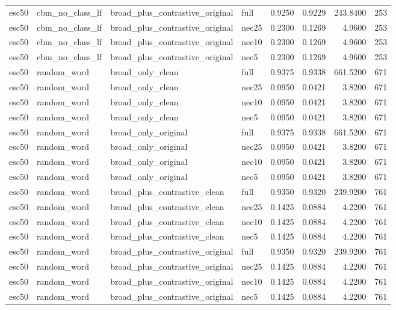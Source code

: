 \begin{table}[t]
\begin{tabular}{llllrrrr}
esc50 & cbm\_no\_class\_lf & broad\_plus\_contrastive\_original & full & 0.9250 & 0.9229 & 243.8400 & 253 \\
esc50 & cbm\_no\_class\_lf & broad\_plus\_contrastive\_original & nec25 & 0.2300 & 0.1269 & 4.9600 & 253 \\
esc50 & cbm\_no\_class\_lf & broad\_plus\_contrastive\_original & nec10 & 0.2300 & 0.1269 & 4.9600 & 253 \\
esc50 & cbm\_no\_class\_lf & broad\_plus\_contrastive\_original & nec5 & 0.2300 & 0.1269 & 4.9600 & 253 \\
esc50 & random\_word & broad\_only\_clean & full & 0.9375 & 0.9338 & 661.5200 & 671 \\
esc50 & random\_word & broad\_only\_clean & nec25 & 0.0950 & 0.0421 & 3.8200 & 671 \\
esc50 & random\_word & broad\_only\_clean & nec10 & 0.0950 & 0.0421 & 3.8200 & 671 \\
esc50 & random\_word & broad\_only\_clean & nec5 & 0.0950 & 0.0421 & 3.8200 & 671 \\
esc50 & random\_word & broad\_only\_original & full & 0.9375 & 0.9338 & 661.5200 & 671 \\
esc50 & random\_word & broad\_only\_original & nec25 & 0.0950 & 0.0421 & 3.8200 & 671 \\
esc50 & random\_word & broad\_only\_original & nec10 & 0.0950 & 0.0421 & 3.8200 & 671 \\
esc50 & random\_word & broad\_only\_original & nec5 & 0.0950 & 0.0421 & 3.8200 & 671 \\
esc50 & random\_word & broad\_plus\_contrastive\_clean & full & 0.9350 & 0.9320 & 239.9200 & 761 \\
esc50 & random\_word & broad\_plus\_contrastive\_clean & nec25 & 0.1425 & 0.0884 & 4.2200 & 761 \\
esc50 & random\_word & broad\_plus\_contrastive\_clean & nec10 & 0.1425 & 0.0884 & 4.2200 & 761 \\
esc50 & random\_word & broad\_plus\_contrastive\_clean & nec5 & 0.1425 & 0.0884 & 4.2200 & 761 \\
esc50 & random\_word & broad\_plus\_contrastive\_original & full & 0.9350 & 0.9320 & 239.9200 & 761 \\
esc50 & random\_word & broad\_plus\_contrastive\_original & nec25 & 0.1425 & 0.0884 & 4.2200 & 761 \\
esc50 & random\_word & broad\_plus\_contrastive\_original & nec10 & 0.1425 & 0.0884 & 4.2200 & 761 \\
esc50 & random\_word & broad\_plus\_contrastive\_original & nec5 & 0.1425 & 0.0884 & 4.2200 & 761 \\

\end{tabular}
\end{table}

